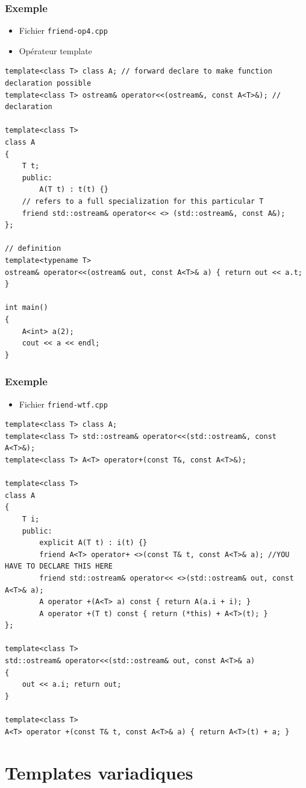 \begin{frame}[containsverbatim]
\frametitle{Exemple}
\begin{itemize}
\item Fichier \texttt{friend-op4.cpp}
\item Opérateur template
\end{itemize}
\begin{lstlisting}
template<class T> class A; // forward declare to make function declaration possible
template<class T> ostream& operator<<(ostream&, const A<T>&); // declaration
 
template<class T>
class A 
{
	T t;
	public:
	    A(T t) : t(t) {}
    // refers to a full specialization for this particular T 
    friend std::ostream& operator<< <> (std::ostream&, const A&);
};
 
// definition
template<typename T>
ostream& operator<<(ostream& out, const A<T>& a) { return out << a.t; }
 
int main()
{
	A<int> a(2);
	cout << a << endl;
}
\end{lstlisting}
\end{frame}

\begin{frame}[containsverbatim]
\frametitle{Exemple}
\begin{itemize}
\item Fichier \texttt{friend-wtf.cpp}
\end{itemize}
\begin{lstlisting}
template<class T> class A;
template<class T> std::ostream& operator<<(std::ostream&, const A<T>&);
template<class T> A<T> operator+(const T&, const A<T>&);

template<class T>
class A
{
	T i;
	public:
		explicit A(T t) : i(t) {}
		friend A<T> operator+ <>(const T& t, const A<T>& a); //YOU HAVE TO DECLARE THIS HERE
		friend std::ostream& operator<< <>(std::ostream& out, const A<T>& a);		
		A operator +(A<T> a) const { return A(a.i + i); }				
		A operator +(T t) const { return (*this) + A<T>(t); }								
};

template<class T>
std::ostream& operator<<(std::ostream& out, const A<T>& a)
{
	out << a.i; return out;
}

template<class T>
A<T> operator +(const T& t, const A<T>& a) { return A<T>(t) + a; }
\end{lstlisting}
\end{frame}

\section{Templates variadiques}

